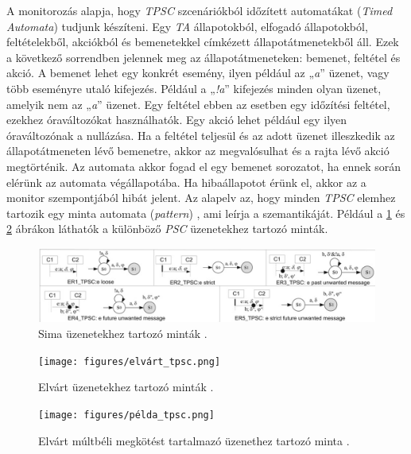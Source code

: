 A monitorozás alapja, hogy \textit{TPSC} szcenáriókból időzített automatákat (\textit{Timed Automata}) tudjunk készíteni.
Egy \textit{TA} állapotokból, elfogadó állapotokból, feltételekből, akciókból és bemenetekkel címkézett állapotátmenetekből áll.
Ezek a következő sorrendben jelennek meg az állapotátmeneteken: bemenet, feltétel és akció.
A bemenet lehet egy konkrét esemény, ilyen például az „\textit{a}” üzenet, vagy több eseményre utaló kifejezés.
Például a „\textit{!a}” kifejezés minden olyan üzenet, amelyik nem az „\textit{a}” üzenet.
Egy feltétel ebben az esetben egy időzítési feltétel, ezekhez óraváltozókat használhatók.
Egy akció lehet például egy ilyen óraváltozónak a nullázása.
Ha a feltétel teljesül és az adott üzenet illeszkedik az állapotátmeneten lévő bemenetre, akkor az megvalósulhat és a rajta lévő akció megtörténik.
Az automata akkor fogad el egy bemenet sorozatot, ha ennek során elérünk az automata végállapotába.
Ha hibaállapotot érünk el, akkor az a monitor szempontjából hibát jelent.
Az alapelv az, hogy minden \textit{TPSC} elemhez tartozik egy minta automata (\textit{pattern}) \cite{TPSC1}, ami leírja a szemantikáját.
Például a \ref{tpsc_sima} és \ref{tpsc_elvárt} ábrákon láthatók a különböző \textit{PSC} üzenetekhez tartozó minták.

\begin{figure}[!ht]
    \centering
    \includegraphics[width=150mm, keepaspectratio]{figures/sima_tpsc.png}
    \caption{Sima üzenetekhez tartozó minták \cite{TPSC1}.}
    \label{tpsc_sima}
\end{figure}

\begin{figure}[!ht]
    \centering
    \texttt{[image: figures/elvárt\_tpsc.png]}
    \caption{Elvárt üzenetekhez tartozó minták \cite{TPSC1}.}
    \label{tpsc_elvárt}
\end{figure}

\begin{figure}[!ht]
    \centering
    \texttt{[image: figures/példa\_tpsc.png]}
    \caption{Elvárt múltbéli megkötést tartalmazó üzenethez tartozó minta \cite{TPSC1}.}
    \label{tpsc_példa}
\end{figure}

